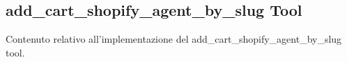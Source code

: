\subsection{add\_cart\_shopify\_agent\_by\_slug Tool}

Contenuto relativo all'implementazione del add\_cart\_shopify\_agent\_by\_slug tool.
